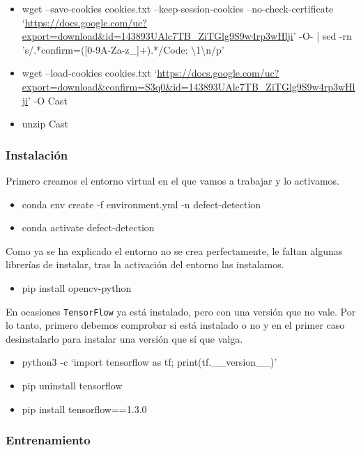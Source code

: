 \begin{itemize}
    \tightlist
    \item wget --save-cookies cookies.txt --keep-session-cookies --no-check-certificate `\url{https://docs.google.com/uc?export=download\&id=143893UAlc7TB_ZiTGlg9S9w4rp3wHlji}' -O- | sed -rn 's/.*confirm=([0-9A-Za-z\_]+).*/Code: \textbackslash{}1\textbackslash{}n/p'
    \item wget --load-cookies cookies.txt `\url{https://docs.google.com/uc?export=download\&confirm=S3q0\&id=143893UAlc7TB_ZiTGlg9S9w4rp3wHlji}' -O Cast
    \item unzip Cast
\end{itemize}

\subsubsection{Instalación\label{instalacion}}

Primero creamos el entorno virtual en el que vamos a trabajar y lo activamos.

\begin{itemize}
    \tightlist
    \item conda env create -f environment.yml -n defect-detection
    \item conda activate defect-detection
\end{itemize}

Como ya se ha explicado el entorno no se crea perfectamente, le faltan algunas librerías de instalar, tras la activación del entorno las instalamos.

\begin{itemize}
    \tightlist
    \item pip install opencv-python
\end{itemize}

En ocasiones \texttt{TensorFlow} ya está instalado, pero con una versión que no vale. Por lo tanto, primero debemos comprobar si está instalado o no y en el primer caso desinstalarlo para instalar una versión que sí que valga.

\begin{itemize}
    \tightlist
    \item python3 -c `import tensorflow as tf; print(tf.\_\_version\_\_)'
    \item pip uninstall tensorflow
    \item pip install tensorflow==1.3.0
\end{itemize}

\subsubsection{Entrenamiento}

